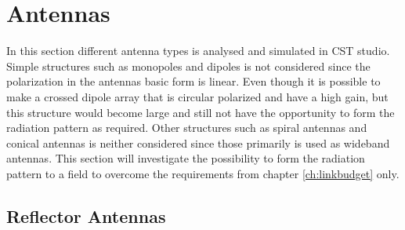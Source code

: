 \chapter{Antennas}\label{ch:antennas}

In this section different antenna types is analysed and simulated in CST studio. Simple structures such as monopoles and dipoles is not considered since the polarization in the antennas basic form is linear. Even though it is possible to make a crossed dipole array that is circular polarized and have a high gain, but this structure would become large and still not have the opportunity to form the radiation pattern as required. Other structures such as spiral antennas and conical antennas is neither considered since those primarily is used as wideband antennas. This section will investigate the possibility to form the radiation pattern to a field to overcome the requirements from chapter \ref{ch:linkbudget} only.     

\section{Reflector Antennas}

